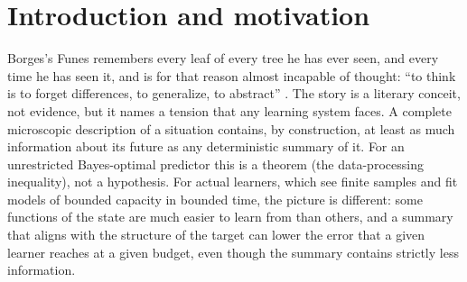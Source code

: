 \documentclass[11pt,a4paper]{article}
\begin{document}
\begin{abstract}
coordinates: configurations matched on the three global summaries have futures
twelve sweeps ahead whose true conditional means agree to within 8\% of their
variance (closure index $0.918\pm0.004$), against 0.27 for a matched random
projection and 0.57 for the disorder scalar alone; re-ranking matched
configurations by microscopic detail recovers about one further point, and by
the previous macrostate a small nonzero improvement. This supports approximate conditional-mean closure for the measured
observables over the tested distribution and horizons, not full distributional
sufficiency, a general autonomous macroscopic law or Markovian dynamics. The
small nonzero history-refinement effect does not establish independence from
the past. We position these results as the first two stages of a programme on
abstraction discovery, transfer and adaptation, and propose minimal
falsification tests for the later stages. Code, raw results and figures are
released for replication.
\end{abstract}

\section{Introduction and motivation}

Borges's Funes remembers every leaf of every tree he has ever seen, and every
time he has seen it, and is for that reason almost incapable of thought: ``to
think is to forget differences, to generalize, to abstract''
\citep{borges1998}. The story is a literary conceit, not evidence, but it names
a tension that any learning system faces. A complete microscopic description of
a situation contains, by construction, at least as much information about its
future as any deterministic summary of it. For an unrestricted Bayes-optimal
predictor this is a theorem (the data-processing inequality), not a hypothesis.
For actual learners, which see finite samples and fit models of bounded
capacity in bounded time, the picture is different: some functions of the state
are much easier to learn from than others, and a summary that aligns with the
structure of the target can lower the error that a given learner reaches at a
given budget, even though the summary contains strictly less information.
\end{document}

